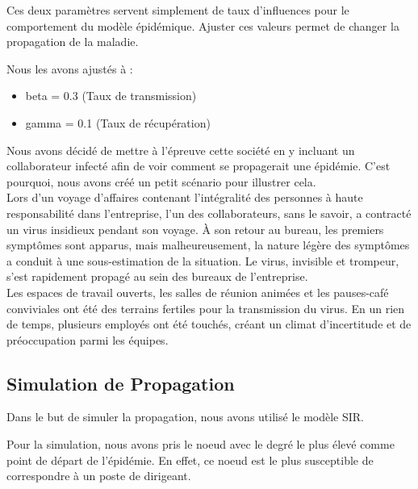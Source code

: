 \documentclass{article}
\begin{document}
Ces deux paramètres servent simplement de taux d'influences pour le comportement du modèle épidémique. Ajuster ces valeurs permet de changer la propagation de la maladie.

Nous les avons ajustés à :
\begin{itemize}
    \item beta = 0.3 (Taux de transmission)
    \item gamma = 0.1 (Taux de récupération)
\end{itemize}


Nous avons décidé de mettre à l'épreuve cette société en y incluant un collaborateur infecté afin de voir comment se propagerait une épidémie. C'est pourquoi, nous avons créé un petit scénario pour illustrer cela. \\

Lors d'un voyage d'affaires contenant l'intégralité des personnes à haute responsabilité dans l'entreprise, l'un des collaborateurs, sans le savoir, a contracté un virus insidieux pendant son voyage. À son retour au bureau, les premiers symptômes sont apparus, mais malheureusement, la nature légère des symptômes a conduit à une sous-estimation de la situation. Le virus, invisible et trompeur, s'est rapidement propagé au sein des bureaux de l'entreprise. \\

Les espaces de travail ouverts, les salles de réunion animées et les pauses-café conviviales ont été des terrains fertiles pour la transmission du virus. En un rien de temps, plusieurs employés ont été touchés, créant un climat d'incertitude et de préoccupation parmi les équipes.

\subsection{Simulation de Propagation}

Dans le but de simuler la propagation, nous avons utilisé le modèle SIR.

Pour la simulation, nous avons pris le noeud avec le degré le plus élevé comme point de départ de l'épidémie. En effet, ce noeud est le plus susceptible de correspondre à un poste de dirigeant. \\
\end{document}

